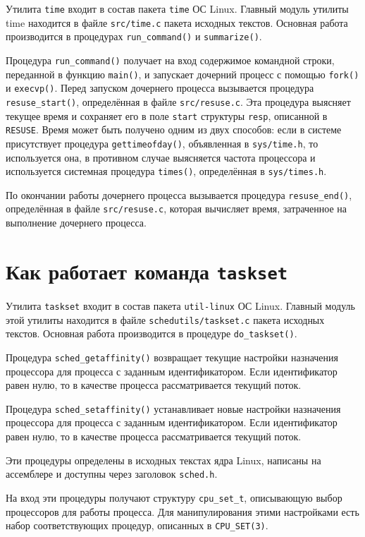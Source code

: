 \documentclass[12pt,a4paper]{article}
\begin{document}
Утилита \texttt{time} входит в состав пакета \texttt{time} ОС Linux. Главный модуль утилиты time находится в файле 
\texttt{src/time.c} пакета исходных текстов. Основная работа производится в процедурах \texttt{run\_command()} и 
\texttt{summarize()}.

Процедура \texttt{run\_command()} получает на вход содержимое командной строки, переданной в функцию \texttt{main()}, и 
запускает дочерний процесс с помощью \texttt{fork()} и \texttt{execvp()}. Перед запуском дочернего процесса вызывается 
процедура \texttt{resuse\_start()}, определённая в файле \texttt{src/resuse.c}. Эта процедура выясняет текущее время и 
сохраняет его в поле \texttt{start} структуры \texttt{resp}, описанной в \texttt{RESUSE}. Время может быть получено 
одним из двух способов: если в системе присутствует процедура \texttt{gettimeofday()}, объявленная в 
\texttt{sys/time.h}, то используется она, в противном случае выясняется частота процессора и используется системная 
процедура \texttt{times()}, определённая в \texttt{sys/times.h}.

По окончании работы дочернего процесса вызывается процедура \texttt{resuse\_end()}, определённая в файле 
\texttt{src/resuse.c}, которая вычисляет время, затраченное на выполнение дочернего процесса.

\section{Как работает команда \texttt{taskset}}

Утилита \texttt{taskset} входит в состав пакета \texttt{util-linux} ОС Linux. Главный модуль этой утилиты находится в 
файле \texttt{schedutils/taskset.c} пакета исходных текстов. Основная работа производится в процедуре 
\texttt{do\_taskset()}.

Процедура \texttt{sched\_getaffinity()} возвращает текущие настройки назначения процессора для процесса с заданным 
идентификатором. Если идентификатор равен нулю, то в качестве процесса рассматривается текущий поток.

Процедура \texttt{sched\_setaffinity()} устанавливает новые настройки назначения процессора для процесса с заданным 
идентификатором. Если идентификатор равен нулю, то в качестве процесса рассматривается текущий поток.

Эти процедуры определены в исходных текстах ядра Linux, написаны на ассемблере и доступны через заголовок 
\texttt{sched.h}.

На вход эти процедуры получают структуру \texttt{cpu\_set\_t}, описывающую выбор процессоров для работы процесса. Для 
манипулирования этими настройками есть набор соответствующих процедур, описанных в \texttt{CPU\_SET(3)}.
\end{document}
